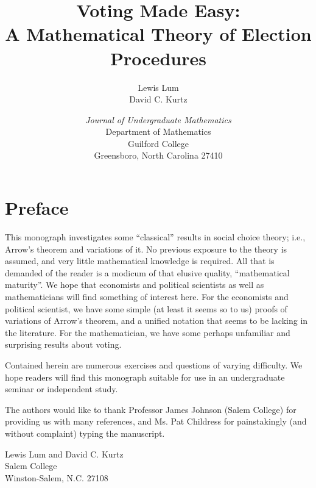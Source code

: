 \documentclass{article}
\let\titlepageAuthor\author
\renewcommand{\author}[1]{\newcommand{\headerAuthor}{#1}\titlepageAuthor{#1}}
\let\titlepageTitle\title
\renewcommand{\title}[1]{\newcommand{\headerTitle}{#1}\titlepageTitle{#1}}
\begin{document}
\title{Voting Made Easy: \\ A Mathematical Theory of Election Procedures}
\author{Lewis Lum \\ David C. Kurtz}
\date{\vspace{3cm}
  \emph{Journal of Undergraduate Mathematics}
  \\ Department of Mathematics
  \\ Guilford College
  \\ Greensboro, North Carolina 27410
  }
\maketitle
\thispagestyle{empty}

\newpage

\setcounter{tocdepth}{3} 
\tableofcontents
\thispagestyle{empty}


\newpage

\section*{Preface}


This monograph investigates some ``classical'' results in social choice theory; i.e., Arrow's theorem and variations of it. No previous exposure to the theory is assumed, and very little mathematical knowledge is required. All that is demanded of the reader is a modicum of that elusive quality, ``mathematical maturity''. We hope that economists and political scientists as well as mathematicians will find something of interest here. For the economists and political scientist, we have some simple (at least it seems so to us) proofs of variations of Arrow's theorem, and a unified notation that seems to be lacking in the literature. For the mathematician, we have some perhaps unfamiliar and surprising results about voting.

Contained herein are numerous exercises and questions of varying difficulty. We hope readers will find this monograph suitable for use in an undergraduate seminar or independent study.

The authors would like to thank Professor James Johnson (Salem College) for providing us with many references, and Ms. Pat Childress for painstakingly (and without complaint) typing the manuscript.

\begin{flushright}
Lewis Lum and David C. Kurtz \\
Salem College \\
Winston-Salem, N.C. 27108
\end{flushright}
\end{document}
